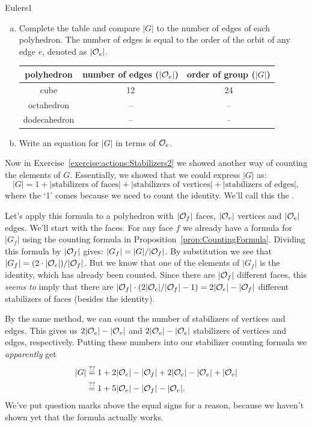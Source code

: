 \begin {exercise}{Eulers1}
\begin {enumerate}[(a)]
\item
Complete the table and compare $|G|$ to the number of edges of each polyhedron.  The number of edges is equal to the order of the orbit of any edge $e$, denoted as $|{\cal O}_e|$.

\begin{tabular}{|c | c | c|}\hline
polyhedron & number of edges ($|{\cal O}_e|$) & order of group ($|G|$)\\ \hline
cube &  12 &   24\\ \hline
octahedron & -- &--\\ \hline
dodecahedron &  --&--\\ \hline 
\end{tabular}
\item Write an equation for $|G|$ in terms of ${\cal O}_e$.
\end{enumerate}
\end {exercise}
 Now in Exercise~\ref{exercise:actions:Stabilizers2} we showed another way of counting the elements of $G$. Essentially, we showed that we could express $|G|$ as:
\[ |G| = 1 + |\text{stabilizers of faces}| + |\text{stabilizers of vertices}| + |\text{stabilizers of edges}|, \]
where the `1' comes because we need to count the identity.
We'll call this the .

Let's apply this formula to a polyhedron with $|{\cal O}_f|$ faces, $|{\cal O}_v|$ vertices and $|{\cal O}_e|$ edges.  
We'll start with the faces.   For any face $f$ we already have a formula for $|G_f|$  using the counting formula in Proposition~\ref{prop:CountingFormula}. Dividing this formula by $|{\cal O}_f|$ gives:  $|G_f|=|G|/|{\cal O}_f|$.  By substitution we see that $|G_f|=(2\cdot|{\cal O}_e|)/|{\cal O}_f|$. But we know that one of the elements of $|G_f|$ is the identity, which has already been counted.    Since there are $|{\cal O}_f|$ different faces, this\emph{ seems to} imply that there are  $|{\cal O}_f|\cdot (2|{\cal O}_e|/|{\cal O}_f|-1)= 2|{\cal O}_e|-|{\cal O}_f|$ different stabilizers of faces (besides the identity). 

 By the same method, we can count the number of stabilizers of vertices and edges. This gives us $2|{\cal O}_e|-|{\cal O}_v|$ and $2|{\cal O}_e|-|{\cal O}_e|$ stabilizers of vertices and edges, respectively.  Putting these numbers into our stabilizer counting formula we \emph {apparently} get
 \begin{align*}
|G| &\stackrel{??}{=} 1+ 2|{\cal O}_e|-|{\cal O}_f|+ 2|{\cal O}_e|-|{\cal O}_v| +|{\cal O}_e| \\
&\stackrel{??}{=} 1+ 5|{\cal O}_e|-|{\cal O}_f|-|{\cal O}_v|.
\end{align*}
We've put question marks above the equal signs for a reason, because we haven't shown yet that the formula actually works. 

